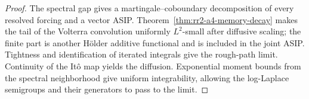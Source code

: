 \begin{proof}
The spectral gap gives a martingale--coboundary decomposition of every
resolved forcing and a vector ASIP.  Theorem~\ref{thm:rr2-a4-memory-decay}
makes the tail of the Volterra convolution uniformly \(L^2\)-small after
diffusive scaling; the finite part is another Hölder additive functional and
is included in the joint ASIP.  Tightness and identification of iterated
integrals give the rough-path limit.  Continuity of the It\^o map yields the
diffusion.  Exponential moment bounds from the spectral neighborhood give
uniform integrability, allowing the log-Laplace semigroups and their
generators to pass to the limit.
\end{proof}
